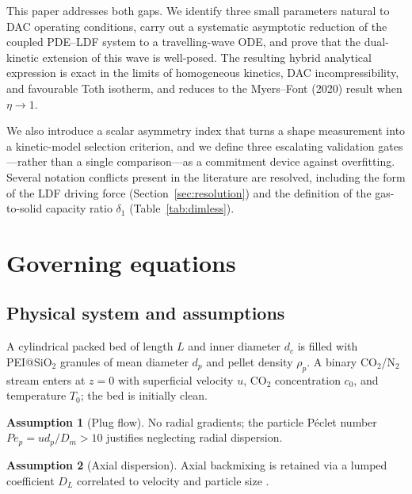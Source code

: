 \documentclass[a4paper]{amsart}
\theoremstyle{definition}
\newtheorem{assumption}{Assumption}
\begin{document}
This paper addresses both gaps.  We identify three small parameters
  natural to DAC operating conditions, carry out
a systematic asymptotic reduction of the coupled PDE--LDF system to a
travelling-wave ODE, and prove that the dual-kinetic extension of this wave
is well-posed.  The resulting hybrid analytical expression is exact in the
limits of homogeneous kinetics, DAC incompressibility, and favourable Toth
isotherm, and reduces to the Myers--Font (2020) result \cite{MyersFont2020}
when $\eta\to1$.

We also introduce a scalar asymmetry index that turns a shape measurement
into a kinetic-model selection criterion, and we define three escalating
validation gates---rather than a single comparison---as a commitment device
against overfitting.  Several notation conflicts present in the literature are
resolved, including the form of the LDF driving force
(Section~\ref{sec:resolution}) and the definition of the gas-to-solid
capacity ratio $\delta_1$ (Table~\ref{tab:dimless}).

\section{Governing equations}

\subsection{Physical system and assumptions}

A cylindrical packed bed of length $L$ and inner diameter $d_c$ is filled
with PEI@SiO$_2$ granules of mean diameter $d_p$ and pellet density $\rho_p$.
A binary CO$_2$/N$_2$ stream enters at $z=0$ with superficial velocity $u$,
CO$_2$ concentration $c_0$, and temperature $T_0$; the bed is initially
clean.

\begin{assumption}[Plug flow]\label{ass:plug}
No radial gradients; the particle P\'eclet number $Pe_p = ud_p/D_m > 10$
justifies neglecting radial dispersion.
\end{assumption}

\begin{assumption}[Axial dispersion]\label{ass:ax}
Axial backmixing is retained via a lumped coefficient $D_L$ correlated to
velocity and particle size \cite{Stampi2024}.
\end{assumption}
\end{document}
